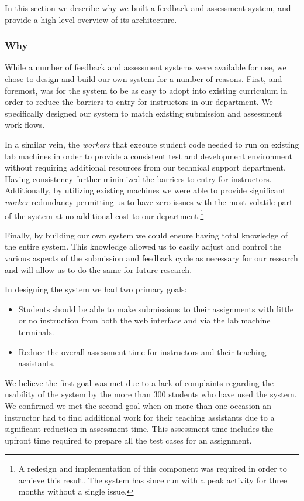 In this section we describe why we built a feedback and assessment system, and
provide a high-level overview of its architecture.

\subsubsection{Why}
While a number of feedback and assessment systems were available for use, we
chose to design and build our own system for a number of reasons. First, and
foremost, was for the system to be as easy to adopt into existing curriculum in
order to reduce the barriers to entry for instructors in our department. We
specifically designed our system to match existing submission and assessment
work flows.

In a similar vein, the \emph{workers} that execute student code needed to run
on existing lab machines in order to provide a consistent test and development
environment without requiring additional resources from our technical support
department. Having consistency further minimized the barriers to entry for
instructors. Additionally, by utilizing existing machines we were able to
provide significant \emph{worker} redundancy permitting us to have zero issues
with the most volatile part of the system at no additional cost to our
department.\footnote{A redesign and implementation of this component was
  required in order to achieve this result. The system has since run with a
  peak activity for three months without a single issue.}

Finally, by building our own system we could ensure having total knowledge of
the entire system. This knowledge allowed us to easily adjust and control the
various aspects of the submission and feedback cycle as necessary for our
research and will allow us to do the same for future research.

In designing the system we had two primary goals:

\begin{itemize}
\item Students should be able to make submissions to their assignments with
  little or no instruction from both the web interface and via the lab machine
  terminals.
\item Reduce the overall assessment time for instructors and their teaching
  assistants.
\end{itemize}

We believe the first goal was met due to a lack of complaints regarding the
usability of the system by the more than 300 students who have used the
system. We confirmed we met the second goal when on more than one occasion an
instructor had to find additional work for their teaching assistants due to a
significant reduction in assessment time. This assessment time includes the
upfront time required to prepare all the test cases for an assignment.


